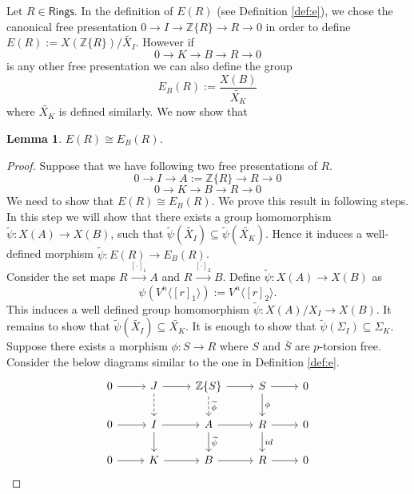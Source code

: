\documentclass[11pt]{amsart}
\theoremstyle{plain}
\newtheorem{lemma}[thm]{Lemma}
\theoremstyle{definition}
\renewcommand{\tilde}{\widetilde}
\newcommand{\Z}{{\mathbb Z}}
\newcommand{\ab}[1]{\langle {#1} \rangle}
\newcommand{\Rings}{{\mathsf{Rings}}}
\begin{document}
\vspace{2mm}
\noindent Let $R\in \Rings$. In the definition of $E(R)$ (see Definition \ref{def:e}), we chose the canonical free presentation $0 \to I \to \Z\{R\} \to R\to 0$ in order to define $E(R):= X(\Z\{R\})/\tilde{X_I}$. However if  $$ 0 \to K \to B \to R \to 0$$ is any other free presentation we can also define the group 
$$E_B(R) := \frac{X(B)}{\tilde{X_K}}$$
where $\tilde{X_K}$ is  defined similarly. 
We now show that 
\begin{lemma}\label{ind:e} $E(R) \cong E_B(R)$.
\end{lemma}
\begin{proof} Suppose that we have following two free presentations of $R$.
 $$0 \to I \to A:=\Z\{R\} \to R \to 0$$
 $$0 \to K \to B \to R \to 0 $$ 
We need to show that $E(R) \cong E_B(R)$. We prove this result in following steps.\\

 In this step we will show that there exists a group homomorphism $\tilde{\psi}: X(A) \to X(B)$, such that $\tilde{\psi}(\tilde{X_I}) \subseteq \tilde{\psi}(\tilde{X_K})$. Hence it induces a well-defined morphism $\tilde{\psi}: E(R) \to E_B(R)$. \\

\noindent Consider the set maps $ R \stackrel{[\cdot]_1}{\longrightarrow}  A$ and $R \stackrel{[\cdot]_2}{\longrightarrow} B$. Define $\tilde{\psi}: X(A) \to X(B)$ as $$\psi(V^n\ab{[r]_1}) := V^n\ab{[r]_2}.$$ This induces a well defined group homomorphism $\tilde{\psi}: X(A)/X_I \to X(B)$.  It remains to show that $\tilde{\psi}(\tilde{X_I} ) \subseteq \tilde{X_K}$. It is enough to show that $\tilde{\psi}(\Sigma_I ) \subseteq \Sigma_K$. \\

\noindent Suppose there exists a morphism $\phi: S \to R$ where $S$ and $\bar{S}$ are $p$-torsion free. Consider the below diagrams similar to the one in Definition \ref{def:e}. \\

\[\begin{tikzcd} \label{diag1}
0 \arrow[r] & J \arrow[d, dashed] \arrow[r] & \Z\{S\} \arrow[d, "\tilde{\phi}", dashed] \arrow[r] & S \arrow[d, "\phi"] \arrow[r] & 0 \\
0 \arrow[r] & I \arrow[r] \arrow[d]  & A \arrow[r]\arrow[d, "\tilde{\psi}"]           & R \arrow[r]\arrow[d, "id"]          & 0 \\
0 \arrow[r] & K \arrow[r]           & B \arrow[r]           & R \arrow[r]           & 0
\end{tikzcd}\]


\end{proof}
\end{document}
